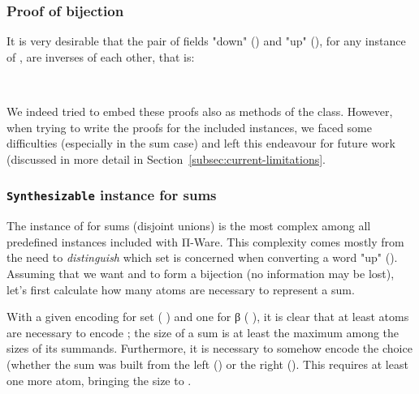             \subsubsection{Proof of bijection}
            It is very desirable that the pair of fields "down" () and "up" (),
            for any instance of , are inverses of each other, that is:

            \begin{center}
                 \AY{(} \AY{:} \AY{)}   \AY{(} \AY{)}  
                \\
                 \AY{(} \AY{:}  \AY{)}   \AY{(} \AY{)}  
            \end{center}

            We indeed tried to embed these proofs also as methods of the  class.
            However, when trying to write the proofs for the included instances,
            we faced some difficulties (especially in the sum case) and left this endeavour for future work
            (discussed in more detail in Section~\ref{subsec:current-limitations}.

            \subsubsection{\texttt{Synthesizable} instance for sums}
            The instance of  for sums (disjoint unions) is the most complex among all predefined
            instances included with Π-Ware.
            This complexity comes mostly from the need to \emph{distinguish} which set is concerned
            when converting a word "up" ().
            Assuming that we want  and  to form a bijection (no information may be lost),
            let's first calculate how many atoms are necessary to represent a sum.

            With a given encoding for set  ( \AY{:}   \AY{\{}\AY{\}})
            and one for β ( \AY{:}   \AY{\{}\AY{\}}),
            it is clear that at least    atoms are necessary to encode   ;
            the size of a sum is at least the maximum among the sizes of its summands.
            Furthermore, it is necessary to somehow encode the choice (whether the sum was built from
            the left () or the right (). This requires at least one more atom,
            bringing the size to  \AY{(}  \AY{)}.

